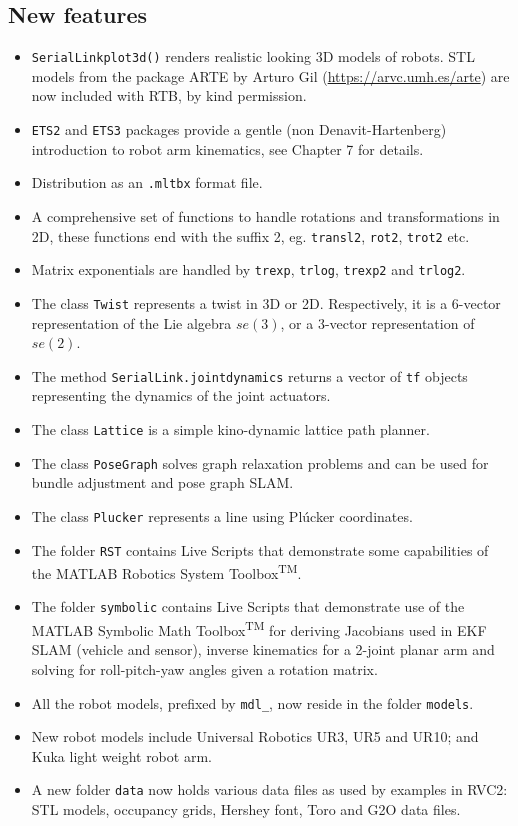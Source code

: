 \documentclass[a4paper,twoside]{report}
\begin{document}
\subsection{New features}
\begin{itemize}
\item \texttt{SerialLinkplot3d()} renders realistic looking 3D models of robots.   STL models from
 the package ARTE by Arturo Gil (\url{https://arvc.umh.es/arte}) are now included with RTB, by kind permission.
\item \texttt{ETS2} and \texttt{ETS3} packages provide a gentle (non Denavit-Hartenberg) introduction to robot arm kinematics, see Chapter 7 for details.
\item Distribution as an \texttt{.mltbx} format file.
\item A comprehensive set of functions to handle rotations and transformations in 2D, these functions end with the suffix 2, eg. \texttt{transl2}, \texttt{rot2}, \texttt{trot2} etc.
\item Matrix exponentials are handled by \texttt{trexp}, \texttt{trlog}, \texttt{trexp2} and \texttt{trlog2}.
\item The class \texttt{Twist} represents a twist in 3D or 2D.  Respectively, it is a 6-vector representation of the Lie algebra $se(3)$, or a
3-vector representation of $se(2)$.
\item The method \texttt{SerialLink.jointdynamics} returns a vector of \texttt{tf} objects representing the dynamics of the joint actuators.
\item The class \texttt{Lattice} is a simple kino-dynamic lattice path planner.
\item The class \texttt{PoseGraph} solves graph relaxation problems and can be used for bundle adjustment and pose graph SLAM.
\item The class \texttt{Plucker} represents a line using Pl\'{u}cker coordinates.
\item The folder \texttt{RST} contains Live Scripts that demonstrate some capabilities of the MATLAB Robotics System Toolbox\textsuperscript{TM}.
\item The folder \texttt{symbolic} contains Live Scripts that demonstrate use of the MATLAB Symbolic Math Toolbox\textsuperscript{TM}
for deriving Jacobians used in EKF SLAM (vehicle and sensor), inverse kinematics for a 2-joint planar arm and solving for roll-pitch-yaw angles
given a rotation matrix.
\item All the robot models, prefixed by \texttt{mdl\_}, now reside in the folder \texttt{models}.
\item New robot models include Universal Robotics UR3, UR5 and UR10; and Kuka light weight robot arm.
\item A new folder \texttt{data} now holds various data files as used by examples in RVC2: STL models, occupancy grids, Hershey font, Toro and G2O
data files.
\end{itemize}
\end{document}
